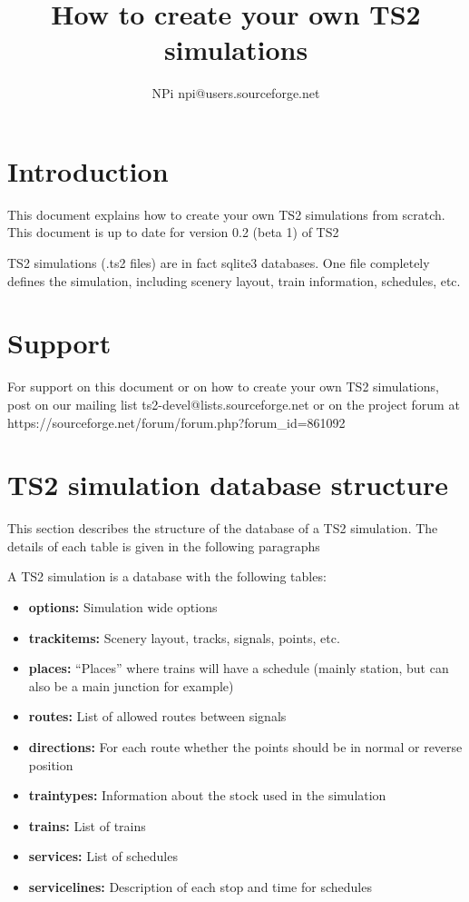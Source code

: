 \documentclass[12pt,a4paper]{article}
\title{How to create your own TS2 simulations}
\author{NPi npi@users.sourceforge.net}
\begin{document}
\maketitle

\tableofcontents
\newpage

\section{Introduction}
This document explains how to create your own TS2 simulations from scratch. This document is up to date for version 0.2 (beta 1) of TS2

TS2 simulations (.ts2 files) are in fact sqlite3 databases. One file completely defines the simulation, including scenery layout, train information, schedules, etc.

\section{Support}
For support on this document or on how to create your own TS2 simulations, post on our mailing list ts2-devel@lists.sourceforge.net or on the project forum at https://sourceforge.net/forum/forum.php?forum\_id=861092 

\section{TS2 simulation database structure}
This section describes the structure of the database of a TS2 simulation. The details of each table is given in the following paragraphs

A TS2 simulation is a database with the following tables:

\begin{itemize}
 \item \textbf{options:} Simulation wide options
 \item \textbf{trackitems:} Scenery layout, tracks, signals, points, etc.
 \item \textbf{places:} ``Places'' where trains will have a schedule (mainly station, but can also be a main junction for example)
 \item \textbf{routes:} List of allowed routes between signals
 \item \textbf{directions:} For each route whether the points should be in normal or reverse position
 \item \textbf{traintypes:} Information about the stock used in the simulation
 \item \textbf{trains:} List of trains
 \item \textbf{services:} List of schedules
 \item \textbf{servicelines:} Description of each stop and time for schedules
\end{itemize}
\end{document}
